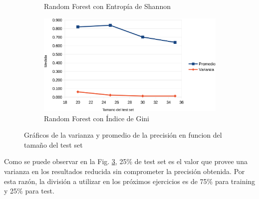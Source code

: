 \documentclass[a4paper]{article}
\begin{document}
\begin{figure}[ht]
\begin{subfigure}{.5\textwidth}
      \caption{Random Forest con Entropía de Shannon}
      \label{fig21:sfig3}
    \end{subfigure}
    \begin{subfigure}{.5\textwidth}
      \centering
      \includegraphics[width=\linewidth]{img/test-set-rf-gini.png}
      \caption{Random Forest con Índice de Gini}
      \label{fig21:sfig4}
    \end{subfigure}
    \caption{Gráficos de la varianza y promedio de la precisión en funcion del tamaño del test set}
    \label{fig21:fig}
  \end{figure}

  Como se puede observar en la Fig. \ref{fig21:fig}, 25\% de test set es el valor que provee una varianza en los resultados reducida sin comprometer la precisión obtenida. Por esta razón, la división a utilizar en los próximos ejercicios es de 75\% para training y 25\% para test.
\end{document}
